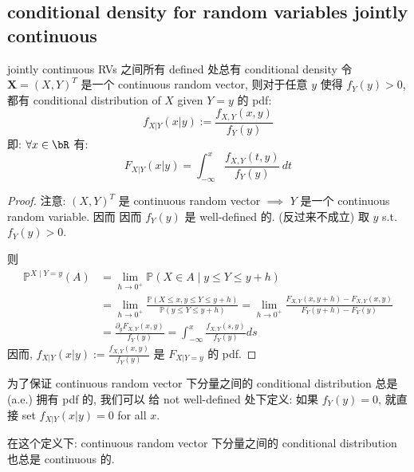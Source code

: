 \subsection{conditional density for random variables jointly continuous}
\begin{theorem}{jointly continuous RVs 之间所有 defined 处总有 conditional density}\label{jointly continuous random variables 之间总有 conditional density}
    令 \(\mathbf{X} = (X, Y)^T\) 是一个 continuous random vector, 
    则对于任意 \(y\) 使得 \(f_Y(y) > 0\), 都有 conditional distribution of \(X\) given \(Y=y\) 的 pdf:
    \[
    f_{X|Y}(x|y) := \frac{f_{X,Y}(x,y)}{f_Y(y)}
    \]
    即: \(\forall x \in \bR\) 有: \[
    F_{X |Y}(x|y) = \int_{-\infty}^x \frac{f_{X,Y}(t,y)}{f_Y(y)} \, dt
    \]
\end{theorem}
\begin{proof}
注意: \((X,Y)^T\) 是 continuous random vector \(\implies\) \(Y\) 是一个 continuous random variable. 因而
因而 \(f_Y(y)\) 是 well-defined 的. (反过来不成立)
取 \(y\) s.t. \(f_Y(y) > 0\).

则 
\begin{align*}
    \mathbb{P}^{X \mid Y=y}(A) &=\lim _{h \rightarrow 0^{+}} \mathbb{P}(X \in A \mid y \leq Y \leq y+h) \\
    &= \lim _{h \rightarrow 0^{+}} \frac{\mathbb{P}(X \leq x, y \leq Y \leq y+h)}{\mathbb{P}(y \leq Y \leq y+h)}=\lim _{h \rightarrow 0^{+}} \frac{F_{X, Y}(x, y+h)-F_{X, Y}(x, y)}{F_Y(y+h)-F_Y(y)}\\
    &=\frac{\partial_y F_{X, Y}(x, y)}{f_Y(y)}=\int_{-\infty}^x \frac{f_{X, Y}(s, y)}{f_Y(y)} ds
\end{align*}
因而, \(f_{X|Y}(x|y) := \frac{f_{X,Y}(x,y)}{f_Y(y)}\) 是 \(F_{X|Y=y}\) 的 pdf.
\end{proof}
\begin{remark}
    为了保证 continuous random vector 下分量之间的 conditional distribution 总是 (a.e.) 拥有 pdf 的, 我们可以
    给 not well-defined 处下定义: 如果 \(f_Y(y) = 0\), 就直接 set \(f_{X|Y}(x|y) = 0\) for all \(x\).
    
    在这个定义下: continuous random vector 下分量之间的 conditional distribution 也总是 continuous 的.
\end{remark}


